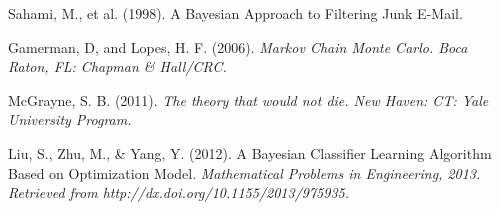 \documentclass[12pt,twoside]{reedthesis}
\begin{document}
\newpage
\begin{thebibliography}{1}

 Sahami, M., et al. (1998). A Bayesian Approach to Filtering Junk E-Mail. 

 Gamerman, D, and Lopes, H. F. (2006). \em{Markov Chain Monte Carlo}. Boca Raton, FL: Chapman \& Hall/CRC.

 McGrayne, S. B. (2011). \em{The theory that would not die}. New Haven: CT: Yale University Program.

 Liu, S., Zhu, M., \& Yang, Y. (2012). A Bayesian Classifier Learning Algorithm Based on Optimization Model. \em{Mathematical Problems in Engineering}, \em{2013}. Retrieved from http://dx.doi.org/10.1155/2013/975935. %

\end{thebibliography}


%  

\end{document}

